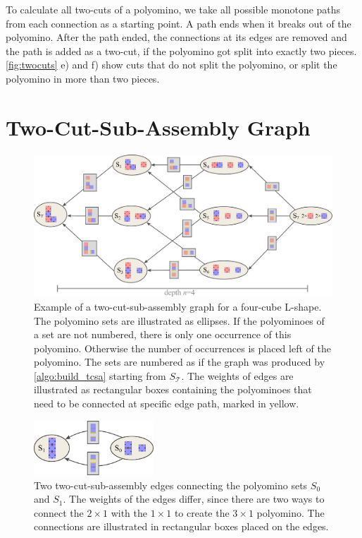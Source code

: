 To calculate all two-cuts of a polyomino, we take all possible monotone paths from each connection as a starting point.
A path ends when it breaks out of the polyomino.
After the path ended, the connections at its edges are removed and the path is added as a two-cut, if the polyomino got split into exactly two pieces.
\autoref{fig:twocuts} e) and f) show cuts that do not split the polyomino, or split the polyomino in more than two pieces.

\newpage

\section{Two-Cut-Sub-Assembly Graph}
\label{sec:tcsa}

\begin{figure}
	\centering
	\includegraphics[width=1\textwidth]{figures/tcsa.pdf}
	\caption[Example of a two-cut-sub-assembly graph]{Example of a two-cut-sub-assembly graph for a four-cube L-shape. The polyomino sets are illustrated as ellipses. If the polyominoes of a set are not numbered, there is only one occurrence of this polyomino. Otherwise the number of occurrences is placed left of the polyomino. The sets are numbered as if the graph was produced by \autoref{algo:build_tcsa} starting from $S_\mathcal{T}$. The weights of edges are illustrated as rectangular boxes containing the polyominoes that need to be connected at specific edge path, marked in yellow.}
	\label{fig:tcsa}
\end{figure}

\begin{figure}
	\centering
	\includegraphics[width=0.4\textwidth]{figures/tcsa_multiedge.pdf}
	\caption[Two-cut-sub-assembly nodes connected with multiple edges]{Two two-cut-sub-assembly edges connecting the polyomino sets $S_0$ and $S_1$. The weights of the edges differ, since there are two ways to connect the $2\times1$ with the $1\times1$ to create the $3\times1$ polyomino. The connections are illustrated in rectangular boxes placed on the edges.}
	\label{fig:tcsa_multiedge}
\end{figure}

